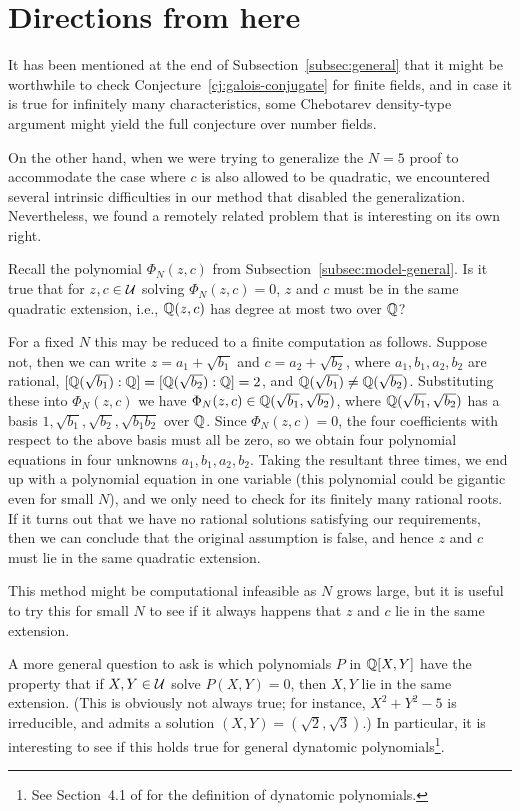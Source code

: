 \section{Directions from here}
\label{sec:map}

It has been mentioned at the end of Subsection~\ref{subsec:general}
that it might be worthwhile to check
Conjecture~\ref{cj:galois-conjugate} for finite fields, and in case it
is true for infinitely many characteristics, some Chebotarev
density-type argument might yield the full conjecture over number
fields.

On the other hand, when we were trying to generalize the $N = 5$ proof
to accommodate the case where $c$ is also allowed to be quadratic, we
encountered several intrinsic difficulties in our method that disabled
the generalization. Nevertheless, we found a remotely related problem
that is interesting on its own right.

\begin{question}
  \label{q:z-c-same-extension}
  Recall the polynomial $\Phi_N(z, c)$ from
  Subsection~\ref{subsec:model-general}. Is it true that for $z, c \in
  \mathcal{U}$ solving $\Phi_N(z, c) = 0$, $z$ and $c$ must be in the same
  quadratic extension, i.e., $\mathbb{Q}(z, c)$ has degree at most two over
  $\mathbb{Q}$?
\end{question}

For a fixed $N$ this may be reduced to a finite computation as
follows. Suppose not, then we can write $z = a_1 + \sqrt{b_1}$ and $c
= a_2 + \sqrt{b_2}$, where $a_1, b_1, a_2, b_2$ are rational,
$[\mathbb{Q}(\sqrt{b_1}) : \mathbb{Q}] = [\mathbb{Q}(\sqrt{b_2}) : \mathbb{Q}] = 2$, and
$\mathbb{Q}(\sqrt{b_1}) \ne \mathbb{Q}(\sqrt{b_2})$. Substituting these into
$\Phi_N(z, c)$ we have $\Phi_N(z, c) \in \mathbb{Q}(\sqrt{b_1}, \sqrt{b_2})$,
where $\mathbb{Q}(\sqrt{b_1}, \sqrt{b_2})$ has a basis $1, \sqrt{b_1},
\sqrt{b_2}, \sqrt{b_1 b_2}$ over $\mathbb{Q}$. Since $\Phi_N(z, c) = 0$, the
four coefficients with respect to the above basis must all be zero, so
we obtain four polynomial equations in four unknowns $a_1, b_1, a_2,
b_2$. Taking the resultant three times, we end up with a polynomial
equation in one variable (this polynomial could be gigantic even for
small $N$), and we only need to check for its finitely many rational
roots. If it turns out that we have no rational solutions satisfying
our requirements, then we can conclude that the original assumption is
false, and hence $z$ and $c$ must lie in the same quadratic extension.

This method might be computational infeasible as $N$
grows large, but it is useful to try this for small $N$ to see if it
always happens that $z$ and $c$ lie in the same extension.

A more general question to ask is which polynomials $P$ in $\mathbb{Q}[X, Y]$
have the property that if $X, Y \in \mathcal{U}$ solve $P(X, Y) = 0$, then $X,
Y$ lie in the same extension. (This is obviously not always true; for
instance, $X^2 + Y^2 - 5$ is irreducible, and admits a solution $(X,
Y) = (\sqrt{2}, \sqrt{3})$.) In particular, it is interesting to see
if this holds true for general dynatomic polynomials\footnote{%
  See Section~4.1 of \cite{MR2316407} for the definition of dynatomic
  polynomials.}.


